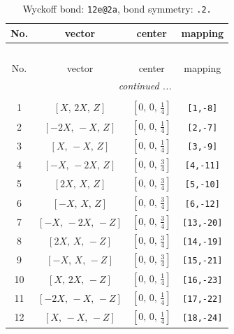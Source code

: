 \documentclass[fleqn,8pt]{jsarticle}
\begin{document}
\renewcommand{\arraystretch}{1.2}
\begin{longtable}{cccc}
\caption{Wyckoff bond: {\tt 12e@2a}, bond symmetry: {\tt .2.}}
 \\
 \hline \hline
No. & vector & center & mapping \\ \hline \endfirsthead

\multicolumn{3}{l}{\tablename\ \thetable{}} \\
 \hline \hline
No. & vector & center & mapping \\ \hline \endhead

 \hline \hline
\multicolumn{3}{r}{\footnotesize\it continued ...} \\ \endfoot

 \hline \hline
\multicolumn{3}{r}{} \\ \endlastfoot

1 & $\left[ X,\, 2 X,\, Z \right]$ & $\left[ 0,\, 0,\, \frac{1}{4} \right]$ & {\tt [1,-8]} \\ \hline
2 & $\left[ - 2 X,\, - X,\, Z \right]$ & $\left[ 0,\, 0,\, \frac{1}{4} \right]$ & {\tt [2,-7]} \\ \hline
3 & $\left[ X,\, - X,\, Z \right]$ & $\left[ 0,\, 0,\, \frac{1}{4} \right]$ & {\tt [3,-9]} \\ \hline
4 & $\left[ - X,\, - 2 X,\, Z \right]$ & $\left[ 0,\, 0,\, \frac{3}{4} \right]$ & {\tt [4,-11]} \\ \hline
5 & $\left[ 2 X,\, X,\, Z \right]$ & $\left[ 0,\, 0,\, \frac{3}{4} \right]$ & {\tt [5,-10]} \\ \hline
6 & $\left[ - X,\, X,\, Z \right]$ & $\left[ 0,\, 0,\, \frac{3}{4} \right]$ & {\tt [6,-12]} \\ \hline
7 & $\left[ - X,\, - 2 X,\, - Z \right]$ & $\left[ 0,\, 0,\, \frac{3}{4} \right]$ & {\tt [13,-20]} \\ \hline
8 & $\left[ 2 X,\, X,\, - Z \right]$ & $\left[ 0,\, 0,\, \frac{3}{4} \right]$ & {\tt [14,-19]} \\ \hline
9 & $\left[ - X,\, X,\, - Z \right]$ & $\left[ 0,\, 0,\, \frac{3}{4} \right]$ & {\tt [15,-21]} \\ \hline
10 & $\left[ X,\, 2 X,\, - Z \right]$ & $\left[ 0,\, 0,\, \frac{1}{4} \right]$ & {\tt [16,-23]} \\ \hline
11 & $\left[ - 2 X,\, - X,\, - Z \right]$ & $\left[ 0,\, 0,\, \frac{1}{4} \right]$ & {\tt [17,-22]} \\ \hline
12 & $\left[ X,\, - X,\, - Z \right]$ & $\left[ 0,\, 0,\, \frac{1}{4} \right]$ & {\tt [18,-24]} \\
\end{longtable}
\end{document}
